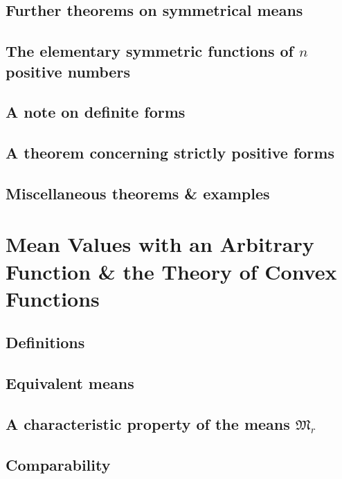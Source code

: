 \documentclass[oneside]{book}
\numberwithin{equation}{section}
\begin{document}
\subsection{Further theorems on symmetrical means}

\subsection{The elementary symmetric functions of $n$ positive numbers}

\subsection{A note on definite forms}

\subsection{A theorem concerning strictly positive forms}

\subsection{Miscellaneous theorems \& examples}


\section{Mean Values with an Arbitrary Function \& the Theory of Convex Functions}

\subsection{Definitions}

\subsection{Equivalent means}

\subsection{A characteristic property of the means $\mathfrak{M}_r$}

\subsection{Comparability}
\end{document}
